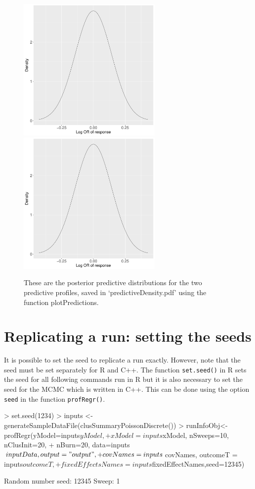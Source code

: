 \documentclass{article}
\begin{document}
\begin{figure}[ht]
\centering
\includegraphics[height=7cm,page=1]{"predictiveDensity"}
\includegraphics[height=7cm,page=1]{"predictiveDensity"}
\caption{These are the posterior predictive distributions for the two predictive profiles, saved in `predictiveDensity.pdf' using the function plotPredictions.\label{fig:predict}}
\end{figure}

\section{Replicating a run: setting the seeds}
It is possible to set the seed to replicate a run exactly. However, note that the seed must be set separately for R and C++. The function \verb|set.seed()| in R sets the seed for all following commands run in R but it is also necessary to set the seed for the MCMC which is written in C++. This can be done using the option \verb|seed| in the function \verb|profRegr()|.
\begin{Schunk}
\begin{Sinput}
> set.seed(1234)
> inputs <- generateSampleDataFile(clusSummaryPoissonDiscrete())
> runInfoObj<-profRegr(yModel=inputs$yModel, 
+                        xModel=inputs$xModel, nSweeps=10, nClusInit=20,
+                        nBurn=20, data=inputs$inputData, output="output", 
+                        covNames = inputs$covNames, outcomeT = inputs$outcomeT,
+                        fixedEffectsNames = inputs$fixedEffectNames,seed=12345)
\end{Sinput}
\begin{Soutput}
Random number seed: 12345
Sweep: 1
\end{Soutput}
\end{Schunk}
\end{document}
